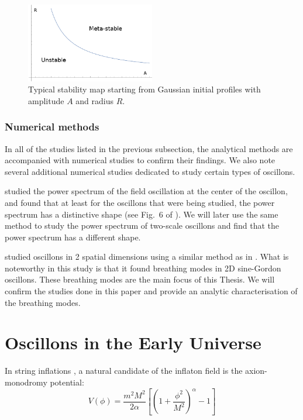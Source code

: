 \documentclass{report}
\begin{document}
\begin{figure}\centering
  \includegraphics[width=0.5\textwidth]{plot/stability.png}
  \caption{Typical stability map starting from Gaussian initial profiles with amplitude $A$ and radius $R$.}
  \label{stability}
\end{figure}

\subsubsection{Numerical methods}
In all of the studies listed in the previous subsection, the analytical methods are accompanied with numerical studies to confirm their findings. We also note several additional numerical studies dedicated to study certain types of oscillons.

\cite{Salmi:2012ta} studied the power spectrum of the field oscillation at the center of the oscillon, and found that at least for the oscillons that were being studied, the power spectrum has a distinctive shape (see Fig.~6 of \cite{Hindmarsh:2006ur}). We will later use the same method to study the power spectrum of two-scale oscillons and find that the power spectrum has a different shape.

\cite{Hindmarsh:2006ur} studied oscillons in 2 spatial dimensions using a similar method as in \cite{Salmi:2012ta}. What is noteworthy in this study is that it found breathing modes in 2D sine-Gordon oscillons. These breathing modes are the main focus of this Thesis. We will confirm the studies done in this paper and provide an analytic characterisation of the breathing modes.

\section{Oscillons in the Early Universe}
In string inflations \cite{stringInflationBook, McAllister:2008hb, Silverstein:2008sg, Flauger:2009ab}, a natural candidate of the inflaton field is the axion-monodromy potential:
\begin{equation}
  V(\phi) = \frac{m^2M^2}{2\alpha} \left[\left(1+\frac{\phi^2}{M^2}\right)^\alpha -1\right]
\end{equation}
\end{document}
